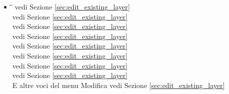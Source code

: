 \begin{itemize}
\item {}
\begin{tabbing}
\hspace{4.5cm}\=\hspace{3cm}\=\hspace{3.5cm}\= \kill
{}
        \> 
        \> vedi Sezione \ref{sec:edit_existing_layer}
        \>  \\
        \> 
        \> vedi Sezione \ref{sec:edit_existing_layer}
        \>  \\
	\> 
	\> vedi Sezione \ref{sec:edit_existing_layer} 
	\>  \\
	\> 
	\> vedi Sezione \ref{sec:edit_existing_layer} 
	\>  \\
	\> 
	\> vedi Sezione \ref{sec:edit_existing_layer} 
	\>  \\
	\> 
	\> vedi Sezione \ref{sec:edit_existing_layer} 
	\>  \\
	\> \keystroke{/}
	\> vedi Sezione \ref{sec:edit_existing_layer} 
	\>  \\
	\> 
	\> vedi Sezione \ref{sec:edit_existing_layer} 
	\>  \\
E altre voci del menu Modifica
	\>
	\> vedi Sezione \ref{sec:edit_existing_layer} 
	\>  \\
\end{tabbing}



\end{itemize}
